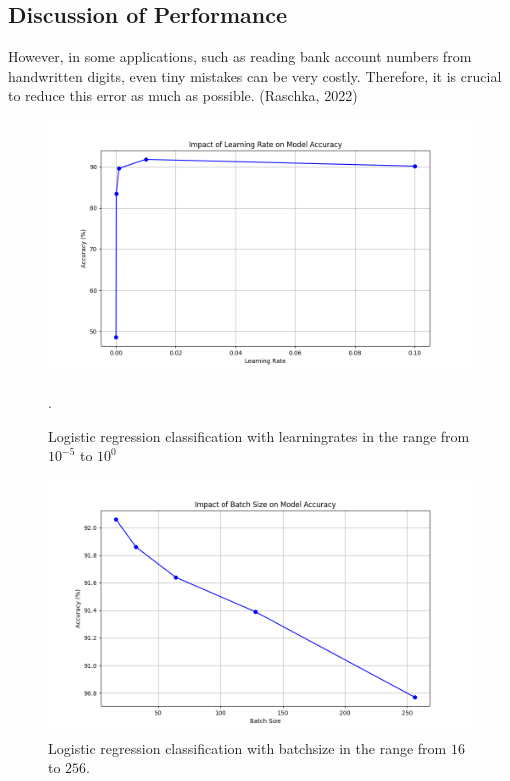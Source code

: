 \subsection{Discussion of Performance}
However, in some applications, such
as reading bank account numbers from handwritten digits, even tiny mistakes can be very costly.
Therefore, it is crucial to reduce this error as much as possible. (Raschka, 2022)

\begin{figure}[H]
    \centering
    \includegraphics[width=\textwidth]{results/learning_rate_study.png}
    \caption{Logistic regression classification with learningrates in the range from $10^{-5}$ to $10^0$}.
    \label{fig:LogRegLearningRate}
\end{figure}

\begin{figure}[H]
    \centering
    \includegraphics[width=\textwidth]{results/batch_size_study.png}
    \caption{Logistic regression classification with batchsize in the range from $16$ to $256$.}
    \label{fig:LogRegBatchsize}
\end{figure}

